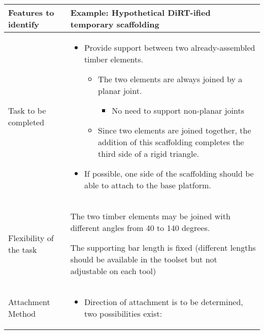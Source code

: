 \begin{table}[H]
\begin{adjustbox}{max width=\textwidth}
\begin{tabular}{p{3.52cm}p{12.35cm}}
\hline
\multicolumn{1}{|p{3.52cm}}{{\footnotesize \textbf{Features to identify}}} & 
\multicolumn{1}{|p{12.35cm}|}{{\footnotesize \textbf{Example: Hypothetical DiRT-ified temporary scaffolding }}} \\ 
\hline
\multicolumn{1}{|p{3.52cm}}{{\footnotesize Task to be completed}} & 
\multicolumn{1}{|p{12.35cm}|}{\begin{itemize}
	\item {\footnotesize Provide support between two already-assembled timber elements. } \newline
\begin{itemize}
	\item {\footnotesize The two elements are always joined by a planar joint. } \newline
\begin{itemize}
	\item {\footnotesize No need to support non-planar joints } \newline
\end{itemize}
	\item {\footnotesize Since two elements are joined together, the addition of this scaffolding completes the third side of a rigid triangle.\par} \newline
\end{itemize}
	\item {\footnotesize If possible, one side of the scaffolding should be able to attach to the base platform.}\end{itemize}
} \\ 
\hline
\multicolumn{1}{|p{3.52cm}}{{\footnotesize Flexibility of the task}} & 
\multicolumn{1}{|p{12.35cm}|}{	\item {\footnotesize The two timber elements may be joined with different angles from 40 to 140 degrees.} \newline
	\item {\footnotesize The supporting bar length is fixed (different lengths should be available in the toolset but not adjustable on each tool)\par}} \\ 
\hline
\multicolumn{1}{|p{3.52cm}}{{\footnotesize Attachment Method}} & 
\multicolumn{1}{|p{12.35cm}|}{\begin{itemize}
	\item {\footnotesize Direction of attachment is to be determined, two possibilities exist:} \newline

\end{itemize}}
\end{tabular}
\end{adjustbox}
\end{table}
